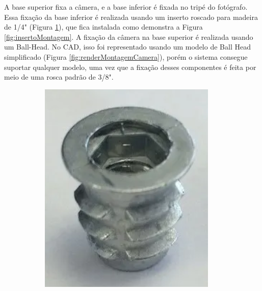 A base superior fixa a câmera, e a base inferior é fixada no tripé do fotógrafo. Essa fixação da base inferior é realizada usando um inserto roscado para madeira de 1/4" (Figura \ref{fig:insertoMadeira}), que fica instalada como demonstra a Figura \ref{fig:insertoMontagem}. A fixação da câmera na base superior é realizada usando um Ball-Head. No CAD, isso foi representado usando um modelo de Ball Head simplificado (Figura \ref{fig:renderMontagemCamera}), porém o sistema consegue suportar qualquer modelo, uma vez que a fixação desses componentes é feita por meio de uma rosca padrão de 3/8".

\begin{figure}[!htb]
	\centering
	\caption{Fixação no tripé: (a) Inserto e (b) Montagem}
	\captionsetup[subfigure]{justification=centering}
	\begin{subfigure}[b]{0.24\textwidth}
		\centering
		\includegraphics[width=\textwidth]{figuras/desPlataforma/insertoMadeira}
		\caption{}
		\label{fig:insertoMadeira}
	\end{subfigure}
	\hfill
	\begin{subfigure}[b]{0.74\textwidth}

\end{subfigure}
\end{figure}
